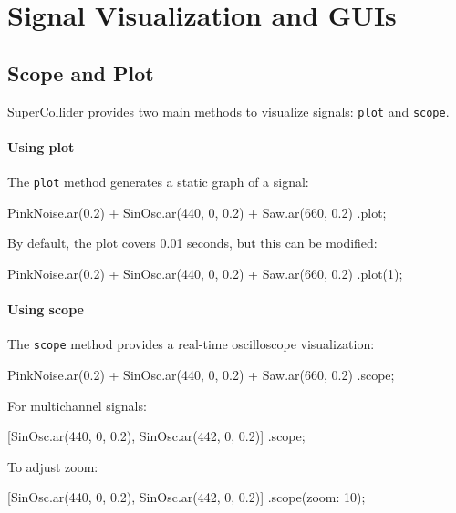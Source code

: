 \section{Signal Visualization and GUIs}

\subsection{Scope and Plot}

SuperCollider provides two main methods to visualize signals: \texttt{plot} and \texttt{scope}.

\paragraph{Using plot}

The \texttt{plot} method generates a static graph of a signal:

\begin{supercollider*}
{ PinkNoise.ar(0.2) + SinOsc.ar(440, 0, 0.2) + Saw.ar(660, 0.2) }.plot;
\end{supercollider*}

By default, the plot covers 0.01 seconds, but this can be modified:

\begin{supercollider*}
{ PinkNoise.ar(0.2) + SinOsc.ar(440, 0, 0.2) + Saw.ar(660, 0.2) }.plot(1);
\end{supercollider*}

\paragraph{Using scope}

The \texttt{scope} method provides a real-time oscilloscope visualization:

\begin{supercollider*}
{ PinkNoise.ar(0.2) + SinOsc.ar(440, 0, 0.2) + Saw.ar(660, 0.2) }.scope;
\end{supercollider*}

For multichannel signals:

\begin{supercollider*}
{ [SinOsc.ar(440, 0, 0.2), SinOsc.ar(442, 0, 0.2)] }.scope;
\end{supercollider*}

To adjust zoom:

\begin{supercollider*}
{ [SinOsc.ar(440, 0, 0.2), SinOsc.ar(442, 0, 0.2)] }.scope(zoom: 10);
\end{supercollider*}

